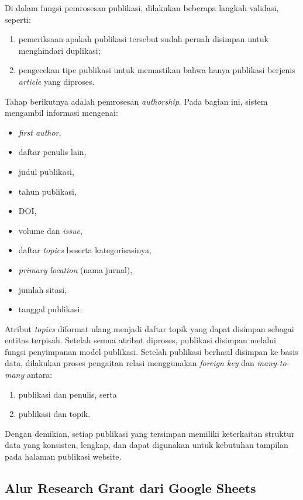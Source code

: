Di dalam fungsi pemrosesan publikasi, dilakukan beberapa langkah validasi, seperti:
\begin{enumerate}
    \item pemeriksaan apakah publikasi tersebut sudah pernah disimpan untuk menghindari duplikasi;
    \item pengecekan tipe publikasi untuk memastikan bahwa hanya publikasi berjenis \textit{article} yang diproses.
\end{enumerate}

Tahap berikutnya adalah pemrosesan \textit{authorship}. Pada bagian ini, sistem mengambil informasi mengenai:
\begin{itemize}
    \item \textit{first author},
    \item daftar penulis lain,
    \item judul publikasi,
    \item tahun publikasi,
    \item DOI,
    \item volume dan \textit{issue},
    \item daftar \textit{topics} beserta kategorisasinya,
    \item \textit{primary location} (nama jurnal),
    \item jumlah sitasi,
    \item tanggal publikasi.
\end{itemize}

Atribut \textit{topics} diformat ulang menjadi daftar topik yang dapat disimpan sebagai entitas terpisah. Setelah semua atribut diproses, publikasi disimpan melalui fungsi penyimpanan model publikasi. Setelah publikasi berhasil disimpan ke basis data, dilakukan proses pengaitan relasi menggunakan \textit{foreign key} dan \textit{many-to-many} antara:
\begin{enumerate}
    \item publikasi dan penulis, serta
    \item publikasi dan topik.
\end{enumerate}

Dengan demikian, setiap publikasi yang tersimpan memiliki keterkaitan struktur data yang konsisten, lengkap, dan dapat digunakan untuk kebutuhan tampilan pada halaman publikasi website.


\subsection{Alur Research Grant dari Google Sheets}

